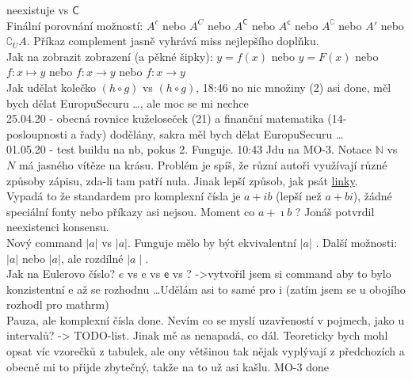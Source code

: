\documentclass[12pt]{article}
\providecommand{\abs}[1]{\lvert#1\rvert}
\newcommand{\absb}[1]{\lvert#1\rvert}
\newcommand{\euler}{\mathrm{e}} %
\newcommand{\iu}{\mathrm{i}} %
\begin{document}
neexistuje vs $\mathsf{C}$\\
Finální porovnání možností: $A^c$ nebo $A^C$ nebo $A^\mathsf{C}$ nebo $A^\mathsf{c}$ nebo $A^\complement$ nebo $A'$ nebo $\complement_U A$. Příkaz complement jasně vyhrává miss nejlepšího doplňku.\\
Jak na zobrazit zobrazení (a pěkné šipky):  $y = f(x) $ nebo $ y = F(x) $ nebo $ f: x \mapsto y $ nebo $ f: x \to y $ nebo $ f: x \rightarrow y$ \\
Jak udělat kolečko $ (h ∘ g)$ vs $ (h \circ g)$, 18:46 no nic množiny (2) asi done, měl bych dělat EuropuSecuru \dots, ale moc se mi nechce\\
25.04.20 - obecná rovnice kuželoseček (21) a finanční matematika (14-posloupnosti a řady) dodělány, sakra měl bych dělat EuropuSecuru \dots \\
01.05.20 - test buildu na nb, pokus 2. Funguje. 10:43 Jdu na MO-3. Notace $\mathbb{N}$ vs $N$ má jasného vítěze na krásu. Problém je spíš, že různí autoři využívají různé způsoby zápisu, zda-li tam patří nula. Jinak lepší způsob, jak psát \href{https://www.latex-tutorial.com/tutorials/hyperlinks/}{linky}.\\
Vypadá to že standardem pro komplexní čísla je $a +ib$ (lepší než $a +bi$), žádné speciální fonty nebo příkazy asi nejsou. Moment co $a +\imath b$ ?  Jonáš potvrdil neexistenci konsensu.\\
Nový command $\abs{a}$ vs $\absb{a}$. Funguje mělo by být ekvivalentní $\lvert a \rvert$ . Další možnosti: $ \vert a \vert$ nebo $|a|$, ale rozdílné $ \mid a \mid$.\\
Jak na Eulerovo číslo? $e$ vs $\mathrm{e}$ vs $\mathsf{e}$ vs ? 	->vytvořil jsem si command aby to bylo konzistentní $\euler$ až se rozhodnu \dots Udělám asi to samé pro $\iu$ (zatím jsem se u obojího rozhodl pro mathrm)\\
Pauza, ale komplexní čísla done. Nevím co se myslí uzavřeností v pojmech, jako u intervalů? -> TODO-list. Jinak mě as nenapadá, co dál. Teoreticky bych mohl opsat víc vzorečků z tabulek, ale ony většinou tak nějak vyplývají z předchozích a obecně mi to přijde zbytečný, takže na to už asi kašlu. MO-3 done
\end{document}
